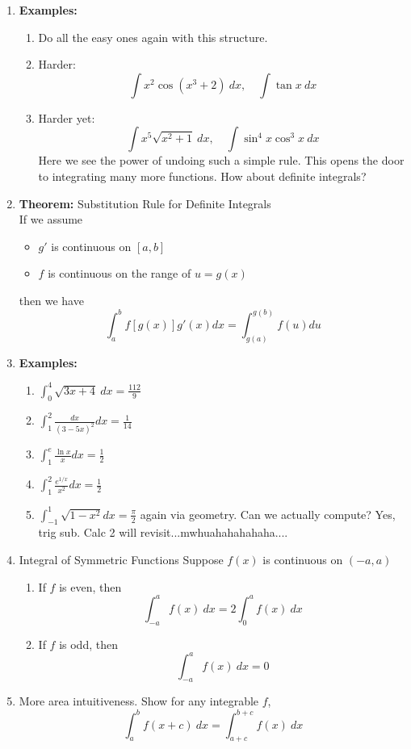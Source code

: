 \documentclass{article}
\newcommand{\ds}{\displaystyle}
\begin{document}
\begin{enumerate}
\item {\bf Examples:}
\begin{enumerate}
\item Do all the easy ones again with this structure.
\item Harder:
$$
\int x^2\cos(x^3+2)~dx,\quad \int \tan x~dx
$$
\item Harder yet:
$$
\int x^5\sqrt{x^2+1}~dx,\quad\int \sin^4x\cos^3x~dx
$$
Here we see the power of undoing such a simple rule. This opens the door to integrating many more functions. How about definite integrals?
\end{enumerate}

\item {\bf Theorem:} Substitution Rule for Definite Integrals \\
If we assume
\begin{itemize}
\item $g'$ is continuous on $[a,b]$
\item $f$ is continuous on the range of $u=g(x)$
\end{itemize}
then we have
$$
\int_a^b f[g(x)]g'(x)dx = \int_{g(a)}^{g(b)}f(u)du
$$

\item {\bf Examples:}
\begin{enumerate}
\item $\ds \int_0^4 \sqrt{3x+4}~dx  = \frac{112}{9}$
\item $\ds \int_1^2\frac{dx}{(3-5x)^2}dx = \frac{1}{14}$
\item $\ds \int_1^e \frac{\ln x}{x}dx = \frac{1}{2}$
\item $\ds \int_1^2 \frac{e^{1/x}}{x^2}dx = \frac{1}{2}$
\item $\ds \int_{-1}^1 \sqrt{1-x^2}dx = \frac{\pi}{2}$ again via geometry. Can we actually compute? Yes, trig sub. Calc 2 will revisit...mwhuahahahahaha....
\end{enumerate}

\item Integral of Symmetric Functions
Suppose $f(x)$ is continuous on $(-a,a)$
\begin{enumerate}
\item If $f$ is even, then 
$$
\int_{-a}^a f(x)~dx = 2\int_0^af(x)~dx 
$$
\item If $f$ is odd, then 
$$
\int_{-a}^a f(x)~dx  = 0
$$
\end{enumerate}

\item More area intuitiveness. Show for any integrable $f$,
$$
\int_a^b f(x+c)~dx = \int_{a+c}^{b+c}f(x)~dx
$$
\end{enumerate}
\end{document}
